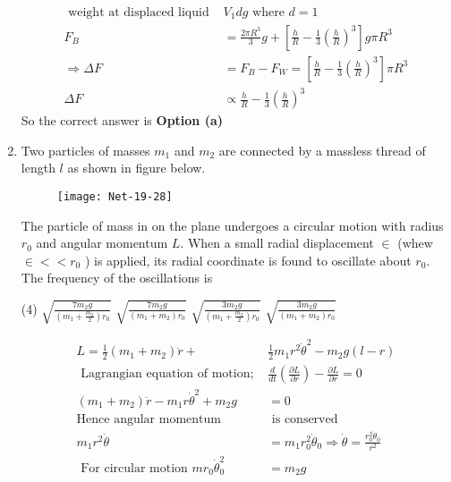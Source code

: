 \begin{enumerate}
\begin{answer}
\begin{align*}
\text { weight at displaced liquid }& V_{1} d g \text { where } d=1\\
F_{B}&=\frac{2 \pi R^{3}}{3} g+\left[\frac{h}{R}-\frac{1}{3}\left(\frac{h}{R}\right)^{3}\right] g \pi R^{3} \\\Rightarrow \Delta F&=F_{B}-F_{W}=\left[\frac{h}{R}-\frac{1}{3}\left(\frac{h}{R}\right)^{3}\right] \pi R^{3} \\
\Delta F &\propto \frac{h}{R}-\frac{1}{3}\left(\frac{h}{R}\right)^{3}
	\end{align*}
		So the correct answer is \textbf{Option (a)}
\end{answer}
\item Two particles of masses $m_{1}$ and $m_{2}$ are connected by a massless thread of length $l$ as shown in figure below.
\begin{figure}[H]
	\centering
	\texttt{[image: Net-19-28]}
\end{figure}
The particle of mass in on the plane undergoes a circular motion with radius $r_{0}$ and angular momentum $L$. When a small radial displacement $\in$ (whew $\in<<r_{0}$ ) is applied, its radial coordinate is found to oscillate about $r_{0}$. The frequency of the oscillations is
 \begin{tasks}(4)
	\task[\textbf{a.}] $\sqrt{\frac{7 m_{2} g}{\left(m_{1}+\frac{m_{2}}{2}\right) r_{0}}}$
	\task[\textbf{b.}]$\sqrt{\frac{7 m_{2} g}{\left(m_{1}+m_{2}\right) r_{0}}}$
	\task[\textbf{c.}]$\sqrt{\frac{3 m_{2} g}{\left(m_{1}+\frac{m_{2}}{2}\right) r_{0}}}$
	\task[\textbf{d.}] $\sqrt{\frac{3 m_{2} g}{\left(m_{1}+m_{2}\right) r_{0}}}$
\end{tasks}
\begin{answer}
	\begin{align*}
	L=\frac{1}{2}\left(m_{1}+m_{2}\right) \ddot{r}+&\frac{1}{2} m_{1} r^{2} \dot{\theta}^{2}-m_{2} g(l-r)\\
\text{	Lagrangian equation of motion; }&
	\frac{d}{d t}\left(\frac{\partial L}{\partial \dot{r}}\right)-\frac{\partial L}{\partial r}=0\\
	\left(m_{1}+m_{2}\right) \ddot{r}-m_{1} r \dot{\theta}^{2}+m_{2} g&=0\\
	\text{Hence angular momentum}&\text{  is conserved}\\
	m_{1} r^{2} \dot{\theta}&=m_{1} r_{0}^{2} \dot{\theta}_{0} \Rightarrow \dot{\theta}=\frac{r_{0}^{2} \dot{\theta}_{0}}{r^{2}}\\
	\text { For circular motion } m r_{0} \dot{\theta}_{0}^{2}&=m_{2} g\\

\end{align*}
\end{answer}
\end{enumerate}
